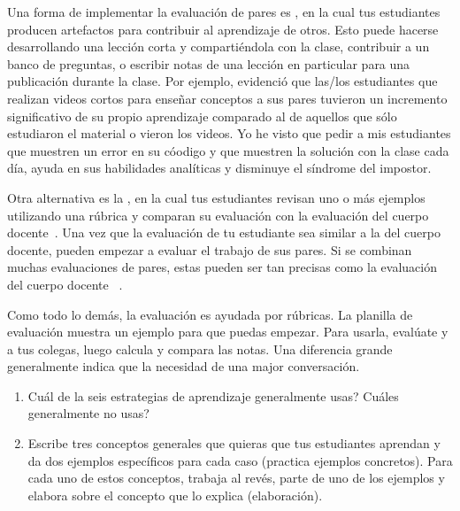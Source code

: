Una forma de implementar la evaluación de pares es ,
en la cual tus estudiantes producen artefactos para contribuir al aprendizaje de otros.
Esto puede hacerse desarrollando una lección corta y compartiéndola con la clase,
contribuir a un banco de preguntas,
o escribir notas de una lección en particular para una publicación durante la clase.
Por ejemplo,
\cite{Fran2018} evidenció que las/los estudiantes que realizan videos cortos para enseñar conceptos a sus pares
tuvieron un incremento significativo de su propio aprendizaje
comparado al de aquellos que sólo estudiaron el material o vieron los videos.
Yo he visto que pedir a mis estudiantes que muestren un error en su cóodigo y que muestren la solución con la clase cada día, 
ayuda en sus habilidades analíticas y disminuye el síndrome del impostor.

Otra alternativa es la ,
en la cual tus estudiantes revisan uno o más ejemplos utilizando una rúbrica
y comparan su evaluación con la evaluación del cuerpo docente~\cite{Kulk2013}.
Una vez que la evaluación de tu estudiante sea similar a la del cuerpo docente,
pueden empezar a evaluar el trabajo de sus pares.
Si se combinan muchas evaluaciones de pares,
estas pueden ser tan precisas como la evaluación del cuerpo docente ~\cite{Pare2008}.

Como todo lo demás,
la evaluación es ayudada por rúbricas.
La planilla de evaluación  muestra un ejemplo para que puedas empezar.
Para usarla,
evalúate y a tus colegas,
luego calcula y compara las notas.
Una diferencia grande generalmente indica que la necesidad de una major conversación.



\begin{enumerate}

\item
  Cuál de la seis estrategias de aprendizaje generalmente usas?
  Cuáles generalmente no usas?

\item
  Escribe tres conceptos generales que quieras que tus estudiantes aprendan
  y da dos ejemplos específicos para cada caso
  (practica ejemplos concretos).
  Para cada uno de estos conceptos,
  trabaja al revés, parte de uno de los ejemplos y elabora sobre el concepto que lo explica
  (elaboración).

\end{enumerate}

